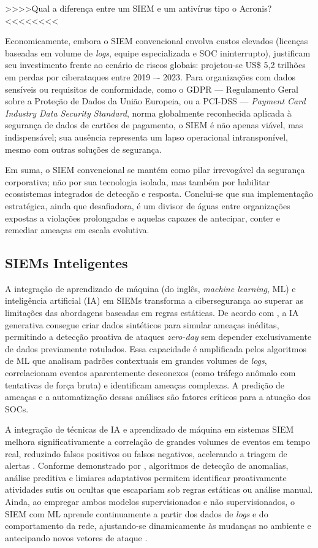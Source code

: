 >>>>Qual a diferença entre um SIEM e um antivírus tipo o Acronis?<<<<<<<<

Economicamente, embora o SIEM convencional envolva custos elevados (licenças baseadas em volume de \textit{logs}, equipe especializada e SOC ininterrupto),  justificam seu investimento frente ao cenário de riscos globais: projetou-se US\$ 5,2 trilhões em perdas por ciberataques entre 2019 –- 2023. 
Para organizações com dados sensíveis ou requisitos de conformidade, como o GDPR --- Regulamento Geral sobre a Proteção de Dados da União Europeia, ou a PCI-DSS --- \textit{Payment Card Industry Data Security Standard}, norma globalmente reconhecida aplicada à segurança de dados de cartões de pagamento, o SIEM é não apenas viável, mas indispensável;
sua ausência representa um lapso operacional intransponível, mesmo com outras soluções de segurança.

Em suma, o SIEM convencional se mantém como pilar irrevogável da segurança corporativa; 
não por sua tecnologia isolada, mas também por habilitar ecossistemas integrados de detecção e resposta. 
Conclui-se que sua implementação estratégica, ainda que desafiadora, é um divisor de águas entre organizações expostas a violações prolongadas e aquelas capazes de antecipar, conter e remediar ameaças em escala evolutiva.


\subsection{SIEMs Inteligentes}

A integração de aprendizado de máquina (do inglês, \textit{machine learning}, ML) e inteligência artificial (IA) em SIEMs transforma a cibersegurança ao superar as limitações das abordagens baseadas em regras estáticas. 
De acordo com , a IA generativa consegue criar dados sintéticos para simular ameaças inéditas, permitindo a detecção proativa de ataques \textit{zero-day} sem depender exclusivamente de dados previamente rotulados. 
Essa capacidade é amplificada pelos algoritmos de ML que analisam padrões contextuais em grandes volumes de \textit{logs}, correlacionam eventos aparentemente desconexos (como tráfego anômalo com tentativas de força bruta) e identificam ameaças complexas. 
A predição de ameaças e a automatização dessas análises são fatores críticos para a atuação dos SOCs.

A integração de técnicas de IA e aprendizado de máquina em sistemas SIEM melhora significativamente a correlação de grandes volumes de eventos em tempo real, reduzindo falsos positivos ou falsos negativos, acelerando a triagem de alertas \cite{PaloAlto1}.
Conforme demonstrado por , algoritmos de detecção de anomalias, análise preditiva e limiares adaptativos permitem identificar proativamente atividades sutis ou ocultas que escapariam sob regras estáticas ou análise manual. 
Ainda, ao empregar ambos modelos supervisionados e não supervisionados, o SIEM com ML aprende continuamente a partir dos dados de \textit{logs} e do comportamento da rede, ajustando-se dinamicamente às mudanças no ambiente e antecipando novos vetores de ataque \cite{jordan2015machine}.

